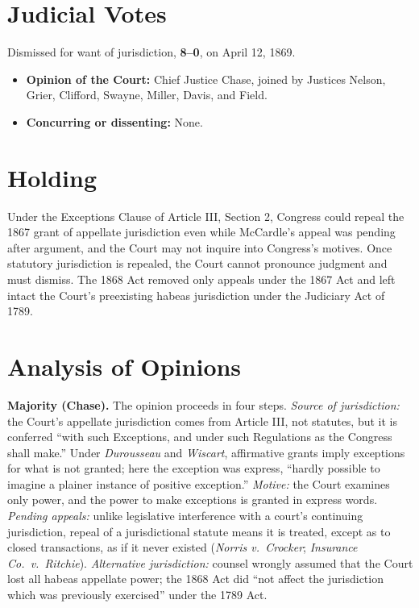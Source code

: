 \documentclass[12pt]{article}
\begin{document}
\section{Judicial Votes}

Dismissed for want of jurisdiction, \textbf{8--0}, on April 12, 1869.
\begin{itemize}
\item \textbf{Opinion of the Court:} Chief Justice Chase, joined by Justices Nelson, Grier, Clifford, Swayne, Miller, Davis, and Field.
\item \textbf{Concurring or dissenting:} None.
\end{itemize}

\section{Holding}

Under the Exceptions Clause of Article III, Section 2, Congress could repeal the 1867 grant of appellate jurisdiction even while McCardle's appeal was pending after argument, and the Court may not inquire into Congress's motives. Once statutory jurisdiction is repealed, the Court cannot pronounce judgment and must dismiss. The 1868 Act removed only appeals under the 1867 Act and left intact the Court's preexisting habeas jurisdiction under the Judiciary Act of 1789.

\section{Analysis of Opinions}

\textbf{Majority (Chase).} The opinion proceeds in four steps. \emph{Source of jurisdiction:} the Court's appellate jurisdiction comes from Article III, not statutes, but it is conferred ``with such Exceptions, and under such Regulations as the Congress shall make.'' Under \textit{Durousseau} and \textit{Wiscart}, affirmative grants imply exceptions for what is not granted; here the exception was express, ``hardly possible to imagine a plainer instance of positive exception.'' \emph{Motive:} the Court examines only power, and the power to make exceptions is granted in express words. \emph{Pending appeals:} unlike legislative interference with a court's continuing jurisdiction, repeal of a jurisdictional statute means it is treated, except as to closed transactions, as if it never existed (\textit{Norris v.\ Crocker}; \textit{Insurance Co.\ v.\ Ritchie}). \emph{Alternative jurisdiction:} counsel wrongly assumed that the Court lost all habeas appellate power; the 1868 Act did ``not affect the jurisdiction which was previously exercised'' under the 1789 Act.
\end{document}
